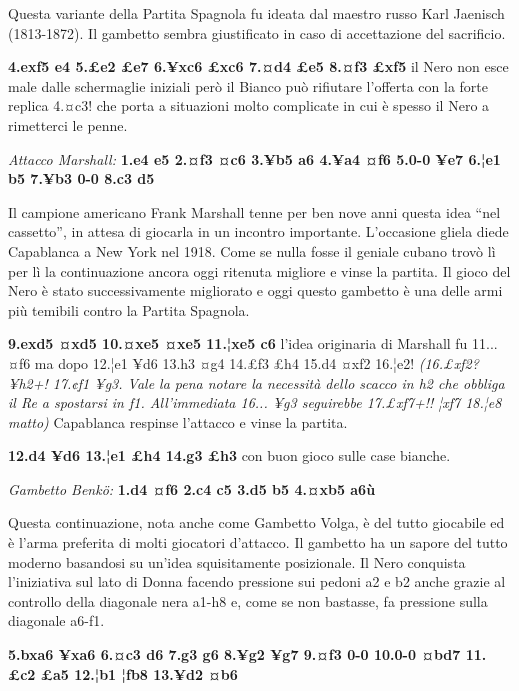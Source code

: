 Questa variante della Partita Spagnola fu ideata dal maestro russo Karl
Jaenisch (1813-1872). Il gambetto sembra giustificato in caso di
accettazione del sacrificio.


\textbf{4.exf5 e4 5.£e2 £e7 6.¥xc6 £xc6 7.¤d4 £e5 8.¤f3 £xf5} il Nero
non esce male dalle schermaglie iniziali però il Bianco può rifiutare
l'offerta con la forte replica 4.¤c3! che porta a situazioni molto
complicate in cui è spesso il Nero a rimetterci le penne.

\emph{Attacco Marshall:} \textbf{1.e4 e5 2.¤f3 ¤c6 3.¥b5 a6 4.¥a4 ¤f6
5.0-0 ¥e7 6.¦e1 b5 7.¥b3 0-0 8.c3 d5}


Il campione americano Frank Marshall tenne per ben nove anni questa idea
``nel cassetto'', in attesa di giocarla in un incontro importante.
L'occasione gliela diede Capablanca a New York nel 1918. Come se nulla
fosse il geniale cubano trovò lì per lì la continuazione ancora oggi
ritenuta migliore e vinse la partita. Il gioco del Nero è stato
successivamente migliorato e oggi questo gambetto è una delle armi più
temibili contro la Partita Spagnola.

\textbf{9.exd5 ¤xd5 10.¤xe5 ¤xe5 11.¦xe5 c6} l'idea originaria di
Marshall fu 11... ¤f6 ma dopo 12.¦e1 ¥d6 13.h3 ¤g4 14.£f3 £h4 15.d4 ¤xf2
16.¦e2! \emph{(16.£xf2? ¥h2+! 17.¢f1 ¥g3. Vale la pena notare la
necessità dello scacco in h2 che obbliga il Re a spostarsi in f1.
All'immediata 16... ¥g3 seguirebbe 17.£xf7+!! ¦xf7 18.¦e8 matto)}
Capablanca respinse l'attacco e vinse la partita.

\textbf{12.d4 ¥d6 13.¦e1 £h4 14.g3 £h3} con buon gioco sulle case
bianche.

\emph{Gambetto Benkö:} \textbf{1.d4 ¤f6 2.c4 c5 3.d5 b5 4.¤xb5 a6ù}


Questa continuazione, nota anche come Gambetto Volga, è del tutto
giocabile ed è l'arma preferita di molti giocatori d'attacco. Il
gambetto ha un sapore del tutto moderno basandosi su un'idea
squisitamente posizionale. Il Nero conquista l'iniziativa sul lato di
Donna facendo pressione sui pedoni a2 e b2 anche grazie al controllo
della diagonale nera a1-h8 e, come se non bastasse, fa pressione sulla
diagonale a6-f1.

\textbf{5.bxa6 ¥xa6 6.¤c3 d6 7.g3 g6 8.¥g2 ¥g7 9.¤f3 0-0 10.0-0 ¤bd7
11.£c2 £a5 12.¦b1 ¦fb8 13.¥d2 ¤b6}

